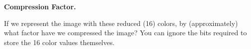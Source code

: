 \item{} \textbf{Compression Factor.}

If we represent the image with these reduced (16) colors, by
(approximately) what factor have we compressed the image? You can ignore the bits required to store the 16 color values themselves.
